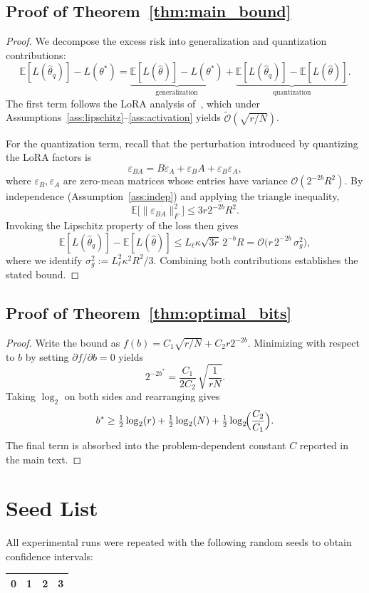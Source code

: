 \documentclass[10pt,twocolumn]{article}
\newcommand{\E}{\mathbb{E}}
\newcommand{\bigO}{\mathcal{O}}
\begin{document}
\subsection{Proof of Theorem~\ref{thm:main_bound}}
\begin{proof}
We decompose the excess risk into generalization and quantization contributions:
\[
\E[L(\hat{\theta}_q)] - L(\theta^*) = \underbrace{\E[L(\hat{\theta})] - L(\theta^*)}_{\text{generalization}} + \underbrace{\E[L(\hat{\theta}_q)] - \E[L(\hat{\theta})]}_{\text{quantization}}.
\]
The first term follows the LoRA analysis of~\citet{malladi2023kernel}, which under Assumptions~\ref{ass:lipschitz}--\ref{ass:activation} yields $\tilde{\mathcal{O}}(\sqrt{r/N})$.

For the quantization term, recall that the perturbation introduced by quantizing the LoRA factors is
\[
\varepsilon_{BA} = B\varepsilon_A + \varepsilon_B A + \varepsilon_B \varepsilon_A,
\]
where $\varepsilon_B, \varepsilon_A$ are zero-mean matrices whose entries have variance $\bigO(2^{-2b}R^2)$.
By independence (Assumption~\ref{ass:indep}) and applying the triangle inequality,
\[
\E\big[\|\varepsilon_{BA}\|_F^2\big] \le 3 r 2^{-2b} R^2.
\]
Invoking the Lipschitz property of the loss then gives
\[
\E[L(\hat{\theta}_q)] - \E[L(\hat{\theta})] \le L_{\ell} \kappa \sqrt{3r}\, 2^{-b} R = \mathcal{O}\big(r \, 2^{-2b} \, \sigma_g^2\big),
\]
where we identify $\sigma_g^2 := L_{\ell}^2 \kappa^2 R^2 / 3$. Combining both contributions establishes the stated bound.
\end{proof}

\subsection{Proof of Theorem~\ref{thm:optimal_bits}}
\begin{proof}
Write the bound as $f(b) = C_1 \sqrt{r/N} + C_2 r 2^{-2b}$. Minimizing with respect to $b$ by setting $\partial f / \partial b = 0$ yields
\[
2^{-2b^*} = \frac{C_1}{2 C_2} \, \sqrt{\frac{1}{rN}}.
\]
Taking $\log_2$ on both sides and rearranging gives
\[
 b^* \ge \tfrac12 \log_2(r) + \tfrac12 \log_2(N) + \tfrac12 \log_2\!\Bigl(\frac{C_2}{C_1}\Bigr).
\]
The final term is absorbed into the problem-dependent constant $C$ reported in the main text.
\end{proof}

\section{Seed List}
\label{sec:seed-list}

All experimental runs were repeated with the following random seeds to obtain confidence intervals:
\begin{center}
\begin{tabular}{cccc}
\toprule
0 & 1 & 2 & 3 \\
\bottomrule
\end{tabular}
\end{center}



\end{document}

